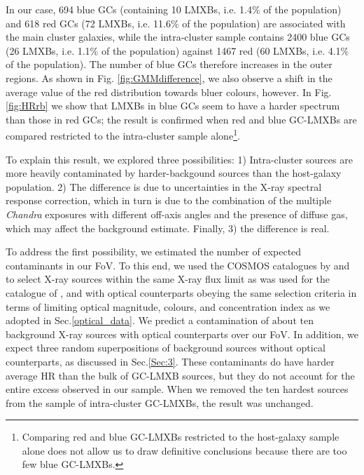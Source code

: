 \documentclass{aa}
\begin{document}
In our case, 694 blue GCs (containing 10 LMXBs, i.e. 1.4\% of the population) and 618 red GCs (72 LMXBs, i.e. 11.6\% of the population) are associated with the main cluster galaxies, while the intra-cluster sample contains 2400 blue GCs (26  LMXBs, i.e. 1.1\% of the population) against  1467 red (60  LMXBs, i.e. 4.1\% of the population). The number of blue GCs therefore increases in the outer regions. As shown in Fig. \ref{fig:GMMdifference}, we also observe a  shift in the average value of the red distribution towards bluer colours, however. 
In Fig. \ref{fig:HRrb} we show that LMXBs in blue GCs seem to have a harder spectrum than those in red GCs; the result is confirmed when red and blue GC-LMXBs are compared restricted to the intra-cluster sample alone\footnote{Comparing red and blue GC-LMXBs restricted to the host-galaxy sample alone does not allow us to draw definitive conclusions because there are too few blue GC-LMXBs.}. 


To explain this result, we explored three possibilities: 1) Intra-cluster sources are more heavily contaminated by harder-backgound sources than the host-galaxy population. 2) The difference is due to uncertainties in the X-ray spectral response correction, which in turn is due to the combination of the multiple \textit{Chandra} exposures with different off-axis angles and the presence of diffuse gas, which may affect the background estimate. Finally, 3) the difference is real.

To address the first possibility, we estimated the number of expected contaminants in our FoV. To this end, we used the COSMOS  catalogues by \citet{Civano2016} and \citet{Laigle2016} to select X-ray sources within the same X-ray flux limit as was used for the catalogue of \cite{Jin2019}, and with optical counterparts obeying the same selection criteria in terms of limiting optical magnitude, colours, and concentration index as we adopted in Sec.\ref{optical_data}. We predict a contamination of $ \text{about ten}$ background X-ray sources with optical counterparts over our FoV. In addition, we expect three random superpositions of background sources without optical counterparts, as discussed in Sec.\ref{Sec:3}. These contaminants do have harder average HR than the bulk of GC-LMXB sources, but they do not account for the entire excess observed in our sample. When we removed the ten hardest sources from the sample of intra-cluster GC-LMXBs, the result was unchanged.
\end{document}
